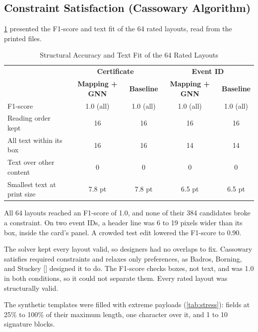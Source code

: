 \begin{refsection}
\subsection{Constraint Satisfaction (Cassowary Algorithm)}

\ref{tab:rated-f1} presented the F1-score and text fit of the 64 rated layouts, read from the printed files.

\begin{table}[!ht]
\centering
\caption{Structural Accuracy and Text Fit of the 64 Rated Layouts}
\label{tab:rated-f1}
\setlength{\tabcolsep}{4pt}
\begin{tabular}{l c c c c}
\hline
 & \multicolumn{2}{c}{\textbf{Certificate}} & \multicolumn{2}{c}{\textbf{Event ID}} \\
 & \textbf{Mapping + GNN} & \textbf{Baseline} & \textbf{Mapping + GNN} & \textbf{Baseline} \\ \hline
F1-score & 1.0 (all) & 1.0 (all) & 1.0 (all) & 1.0 (all) \\
Reading order kept & 16 & 16 & 16 & 16 \\
All text within its box & 16 & 16 & 14 & 14 \\
Text over other content & 0 & 0 & 0 & 0 \\
Smallest text at print size & 7.8 pt & 7.8 pt & 6.5 pt & 6.5 pt \\ \hline
\end{tabular}
\end{table}

All 64 layouts reached an F1-score of 1.0, and none of their 384 candidates broke a constraint. On two event IDs, a header line was 6 to 19 pixels wider than its box, inside the card's panel. A crowded test edit lowered the F1-score to 0.90.

The solver kept every layout valid, so designers had no overlaps to fix. Cassowary satisfies required constraints and relaxes only preferences, as Badros, Borning, and Stuckey [\citeyear{Badros2001Cassowary}] designed it to do. The F1-score checks boxes, not text, and was 1.0 in both conditions, so it could not separate them. Every rated layout was structurally valid.

\clearpage
The synthetic templates were filled with extreme payloads (\ref{tab:stress}): fields at 25\% to 100\% of their maximum length, one character over it, and 1 to 10 signature blocks.


\end{refsection}
